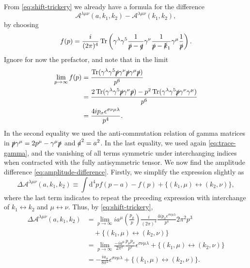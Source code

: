 From \cref{eq:shift-trickery} we already have a formula for the difference
\begin{equation}
  \label{eq:amplitude-difference}
  \mathcal{A}^{\lambda \mu \nu } (a, k_1, k_2) - \mathcal{A}^{\lambda \mu \nu }(k_1, k_2),
\end{equation}
by choosing
\[
  f(p) = \frac{i}{(2\pi)^{4}} \operatorname{Tr} \left( \gamma ^{\lambda }\gamma ^5 \frac{1}{\slashed{p} - \slashed{q}} \gamma ^{\nu } \frac{1}{\slashed{p} - \slashed{k}_{1}} \gamma ^{\mu } \frac{1}{\slashed{p} } \right). 
\]
Ignore for now the prefactor, and note that in the limit
\begin{equation}
  \begin{split}
    \lim_{p\to \infty } f(p) &=
    \frac{\operatorname{Tr}(\gamma ^{\lambda }\gamma ^5 \slashed{p} \gamma ^{\nu } \slashed{p}\gamma ^{\mu }\slashed{p})}{p^6}\\
    &= \frac{2 \operatorname{Tr}(\gamma ^{\lambda }\gamma ^5 \slashed{p}\gamma ^\nu \slashed{p}) - p^2\operatorname{Tr}(\gamma ^{\lambda }\gamma ^5 \slashed{p} \gamma ^{\nu }\gamma ^{\mu })}{p^6}\\
    &= \frac{{4i p_{\sigma }\epsilon ^{\sigma \nu \mu \lambda }}}{p^{4}}.
  \end{split}
\end{equation}
In the second equality we used the anti-commutation relation of gamma matrices in $\slashed{p} \gamma ^{\mu } = 2p^{\mu } - \gamma ^{\mu } \slashed{p}$ and $\slashed{a}^2 = a^2$.
In the last equality, we used again \cref{eq:trace-gamma}, and the vanishing of all terms symmetric under interchanging indices when contracted with the fully antisymmetric tensor.
We now find the amplitude difference \eqref{eq:amplitude-difference}.
Firstly, we simplify the  expression slightly as
\begin{equation}
  \Delta \mathcal{A}^{\lambda \mu \nu }(a, k_1, k_2) \equiv \int \mathrm{d}^4p f(p-a) - f(p) +  \{(k_1,\mu ) \leftrightarrow (k_2, \nu )\},
\end{equation}
where the last term indicates to repeat the preceding expression with interchange of $k_1 \leftrightarrow  k_2$ and $\mu \leftrightarrow \nu$.
Thus, by \cref{eq:shift-trickery},
\begin{equation}
  \label{eq:amplitude-difference-explicit}
  \begin{split}
  \Delta \mathcal{A}^{\lambda \mu \nu}(a, k_1, k_2) &=
    \lim_{p\to \infty } i  a^{\mu } \left( \frac{p_{\mu }}{p} \right)
  \frac{i}{(2\pi)^{4}} \frac{{4ip_{\sigma }\epsilon ^{\sigma \nu \mu \lambda }}}{p^{4}}
  2\pi^2p^3\\
  &\quad + \{(k_1,\mu ) \leftrightarrow (k_2, \nu )\}\\
  &= \lim_{p\to \infty } \frac{{-ia^{\mu }}}{2\pi^2} \frac{{p_{\mu }p_{\sigma }}}{p^2} \epsilon ^{\sigma \nu \mu \lambda } +  \{(k_1,\mu ) \leftrightarrow (k_2, \nu )\}\\
  &= - \frac{ia_{\sigma }}{8 \pi^2}\epsilon ^{\sigma \nu \mu \lambda } +  \{(k_1,\mu ) \leftrightarrow (k_2, \nu )\}.
  \end{split}
\end{equation}


